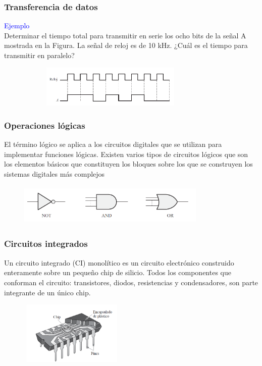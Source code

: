 \documentclass[10.5pt,scale=1.0,t,aspectratio=169,hyperref={pdfpagelabels=false}]{beamer}
\begin{document}
\begin{frame}
	\frametitle{Transferencia de datos}
	\textcolor{blue}{\large Ejemplo} \\
Determinar el tiempo total para transmitir en serie los ocho bits de la señal A mostrada en la Figura. La señal de reloj es de 10 kHz. ¿Cuál es el tiempo para transmitir en paralelo?
\begin{figure}
	\centering
	\includegraphics[width=9cm,height=2cm]{EjemploTransferenciaDatos}
\end{figure}
\end{frame}

\begin{frame}
	\frametitle{Operaciones lógicas}
	El término lógico se aplica a los circuitos digitales que se utilizan para implementar funciones lógicas. Existen varios tipos de circuitos lógicos que son los elementos básicos que constituyen los bloques sobre los que se construyen los sistemas digitales más complejos
\begin{figure}
	\centering
	\includegraphics[width=9cm,height=2cm]{CompuertasLogicas}
\end{figure}
\end{frame}

\begin{frame}
	\frametitle{Circuitos integrados}
	Un circuito integrado (CI) monolítico es un circuito electrónico construido enteramente sobre un pequeño chip de silicio. Todos los componentes que conforman el circuito: transistores, diodos, resistencias y condensadores, son parte integrante de un único chip.
\begin{figure}
	\centering
	\includegraphics[width=5cm,height=3cm]{CircuitoIntegrado}
\end{figure}
\end{frame}
\end{document}
